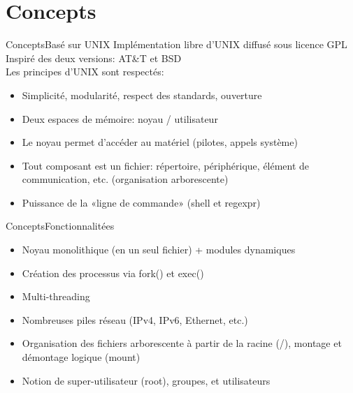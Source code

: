 \section{Concepts}

\begin{frame}{Concepts}{Basé sur UNIX}
	Implémentation libre d'UNIX diffusé sous licence GPL\\
	Inspiré des deux versions: AT\&T et BSD\\
	Les principes d'UNIX sont respectés:
	\begin{itemize}
		\item
			Simplicité, modularité, respect des standards, ouverture
		\item
			Deux espaces de mémoire: noyau / utilisateur
		\item
			Le noyau permet d'accéder au matériel (pilotes, appels système)
		\item
			Tout composant est un fichier: répertoire, périphérique, élément de communication, etc. (organisation arborescente)
		\item
			Puissance de la «ligne de commande» (shell et regexpr)			
	\end{itemize}	
\end{frame}

\begin{frame}{Concepts}{Fonctionnalitées}
	\begin{itemize}
		\item
			Noyau monolithique (en un seul fichier) + modules dynamiques
		\item
			Création des processus via fork() et exec()
		\item
			Multi-threading
		\item
			Nombreuses piles réseau (IPv4, IPv6, Ethernet, etc.)
		\item
			Organisation des fichiers arborescente à partir de la racine (/), montage et démontage logique (mount)
		\item
			Notion de super-utilisateur (root), groupes, et utilisateurs
	\end{itemize}
\end{frame}